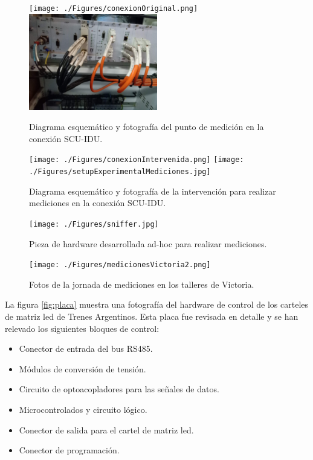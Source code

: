 \begin{figure}[H]
	\centering
      \texttt{[image: ./Figures/conexionOriginal.png]}
      \includegraphics[width=0.5\textwidth]{./Figures/rackPIDS2.jpg}
	\caption{Diagrama esquemático y fotografía del punto de medición en la conexión SCU-IDU.}
	\label{fig:conexionOriginal}
\end{figure}

\begin{figure}[H]
	\centering
      \texttt{[image: ./Figures/conexionIntervenida.png]}
      \texttt{[image: ./Figures/setupExperimentalMediciones.jpg]}
	\caption{Diagrama esquemático y fotografía de la intervención para realizar mediciones en la conexión SCU-IDU.}
	\label{fig:conexionIntervenida}
\end{figure}




\begin{figure}[H]
	\centering
	\texttt{[image: ./Figures/sniffer.jpg]}
	\caption{Pieza de hardware desarrollada ad-hoc para realizar mediciones.}
	\label{fig:sniffer}
\end{figure}




\begin{figure}[H]
	\centering
	\texttt{[image: ./Figures/medicionesVictoria2.png]}
	\caption{Fotos de la jornada de mediciones en los talleres de Victoria.}
	\label{fig:medicionesVictoria2}
\end{figure}

La figura \ref{fig:placa} muestra una fotografía del hardware de control de los carteles de matriz led de Trenes Argentinos. Esta placa fue revisada en detalle y se han relevado los siguientes bloques de control:
\begin{itemize}
\item Conector de entrada del bus RS485.
\item Módulos de conversión de tensión.
\item Circuito de optoacopladores para las señales de datos.
\item Microcontrolados y circuito lógico.
\item Conector de salida para el cartel de matriz led.
\item Conector de programación.
\end{itemize}

